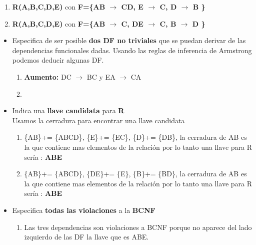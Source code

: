 \documentclass{article}
\begin{document}
\begin{enumerate}
    \begin{enumerate}
    	\item \textbf{R(A,B,C,D,E)} con \textbf{F=\{AB $\rightarrow$ CD, E $\rightarrow$ C, D $\rightarrow$ B \}}
    	\item \textbf{R(A,B,C,D,E)}  con \textbf{F=\{AB $\rightarrow$ C, DE $\rightarrow$ C, B $\rightarrow$ D \}}
    \end{enumerate}   

\begin{itemize}
	\item Especifica  de ser posible \textbf{dos DF no triviales} que se puedan derivar de las dependencias funcionales dadas.
	Usando las reglas de inferencia de Armstrong podemos deducir algunas DF.
	\begin{enumerate}
		\item \textbf{Aumento:} DC $\rightarrow$ BC y EA $\rightarrow$ CA\\ 
		\item 
		 
		
		
	\end{enumerate}
	\item Indica una \textbf{llave candidata} para \textbf{R} \\
	Usamos la cerradura para encontrar una llave candidata
	\begin{enumerate}
		\item \{AB\}+= \{ABCD\}, \{E\}+= \{EC\}, \{D\}+= \{DB\}, la cerradura de AB es la que contiene mas elementos de la relación por lo tanto una llave para R sería : \textbf{ABE}\\ 
		\item \{AB\}+= \{ABCD\}, \{DE\}+= \{E\}, \{B\}+= \{BD\}, la cerradura de AB es la que contiene mas elementos de la relación por lo tanto una llave para R sería : \textbf{ABE}\\ 
		
		
		
	\end{enumerate}
	
	\item Especifica \textbf{todas las violaciones}  a la \textbf{BCNF}\\
	\begin{enumerate}
		\item Las tres dependencias son violaciones a BCNF porque no aparece del lado izquierdo de las DF la llave que es ABE.\\
		

\end{enumerate}
\end{itemize}
\end{enumerate}
\end{document}
